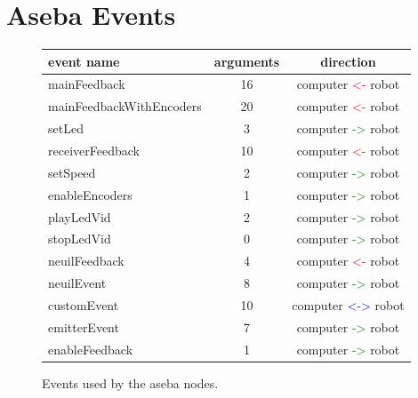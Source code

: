\documentclass[a4paper,11pt]{report}
\begin{document}
\chapter{Aseba Events}\label{sec:asebaEvents}
\begin{figure}[H]
\begin{center}
\begin{tabular}{|l|c|c|}
   \hline
   \textbf{event name} & \textbf{arguments} & \textbf{direction}\\
   \hline
   \hline
   mainFeedback & 16 & computer \textcolor{red}{<-} robot \\
   \hline
   mainFeedbackWithEncoders & 20 & computer \textcolor{red}{<-} robot \\
   \hline
   setLed & 3 & computer \textcolor{green}{->} robot \\
   \hline
   receiverFeedback & 10 & computer \textcolor{red}{<-} robot \\
   \hline
   setSpeed & 2 & computer \textcolor{green}{->} robot \\
   \hline
   enableEncoders & 1 & computer \textcolor{green}{->} robot \\
   \hline
   playLedVid & 2 & computer \textcolor{green}{->} robot \\
   \hline
   stopLedVid & 0 & computer \textcolor{green}{->} robot \\
   \hline
   neuilFeedback & 4 & computer \textcolor{red}{<-} robot \\
   \hline
   neuilEvent & 8 & computer \textcolor{green}{->} robot \\
   \hline
   customEvent & 10 & computer \textcolor{blue}{<->} robot \\
   \hline
   emitterEvent & 7 & computer \textcolor{green}{->} robot \\
   \hline
   enableFeedback & 1 & computer \textcolor{green}{->} robot \\
   \hline
\end{tabular}
\end{center}
\label{tab:event}
\caption{Events used by the aseba nodes.}
\end{figure}

\newpage
\end{document}
